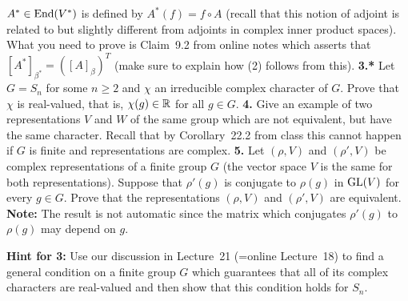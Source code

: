 \documentclass[12pt]{amsart}
\begin{document}
$A^*\in \mathrm {End}(V^*)$ is defined by $A^*(f)=f\circ A$ (recall that this notion of adjoint is related to but slightly different from adjoints in complex
inner product spaces). What you need to prove is Claim~9.2 from online notes which asserts that $[A^*]_{\beta^*}=([A]_{\beta})^T$ (make sure to explain how (2) follows from this).
\skv
{\bf 3.*} Let $G=S_n$ for some $n\geq 2$ and $\chi$ an irreducible complex character of $G$. Prove that $\chi$ is real-valued, that is,
$\chi(g)\in {\mathbb R}$ for all $g\in G$. 
\skv
{\bf 4.} Give an example of two representations $V$ and $W$ of the same group which are not equivalent, but have the same character. Recall that by Corollary~22.2 from class this cannot happen if $G$ is finite and representations are complex.
\skv
{\bf 5.} Let $(\rho,V)$ and $(\rho',V)$ be complex representations of a finite group $G$ (the vector space $V$ is the same for both representations). Suppose that $\rho'(g)$ is conjugate to $\rho(g)$ in ${\rm GL}(V)$ for every $g\in G$. Prove that the representations $(\rho,V)$ and $(\rho',V)$ are equivalent. {\bf Note:} The result is not automatic since the matrix which conjugates
$\rho'(g)$ to $\rho(g)$ may depend on $g$.

\newpage
{\bf Hint for 3:} Use our discussion in Lecture~21 (=online Lecture~18) to find a general condition on a finite group $G$ which guarantees that all of its complex characters are real-valued and then show that this condition holds for $S_n$.
\end{document}
